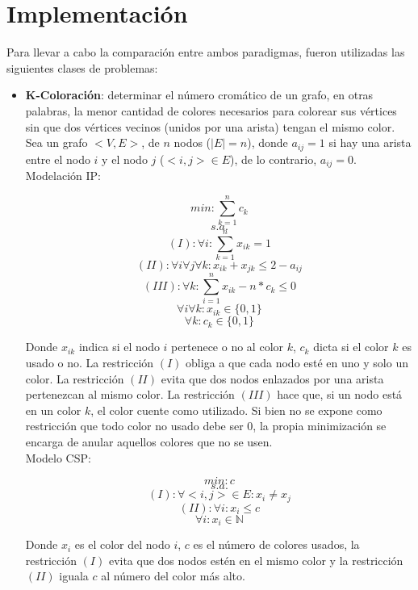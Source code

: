 \documentclass[12pt]{report}
\begin{document}
\chapter{Implementación}

Para llevar a cabo la comparación entre ambos paradigmas, fueron utilizadas las siguientes clases de problemas:
\begin{itemize}
\item \textbf{K-Coloración}: determinar el número cromático de un grafo, en otras palabras, la menor cantidad de colores necesarios para colorear sus vértices sin que dos vértices vecinos (unidos por una arista) tengan el mismo color.\\

Sea un grafo $<V,E>$, de $n$ nodos ($|E|=n$), donde $a_{ij}=1$ si hay una arista entre el nodo $i$ y el nodo $j$ ($<i,j>\in E$), de lo contrario, $a_{ij}=0$.\\

Modelación IP:

$$min: \sum_{k=1}^nc_k$$
$$s.a.$$
$$(I): \forall i: \sum_{k=1}^nx_{ik}=1$$
$$(II): \forall i\forall j \forall k: x_{ik}+x_{jk} \leq 2-a_{ij}$$
$$(III): \forall k: \sum_{i=1}^nx_{ik} -n*c_k\leq 0$$
$$\forall i\forall k: x_{ik}\in\{0,1\}$$
$$\forall k: c_{k}\in\{0,1\}$$

Donde $x_{ik}$ indica si el nodo $i$ pertenece o no al color $k$, $c_k$ dicta si el color $k$ es usado o no. La restricción $(I)$ obliga a que cada nodo esté en uno y solo un color. La restricción $(II)$ evita que dos nodos enlazados por una arista pertenezcan al mismo color. La restricción $(III)$ hace que, si un nodo está en un color $k$, el color cuente como utilizado. Si bien no se expone como restricción que todo color no usado debe ser 0, la propia minimización se encarga de anular aquellos colores que no se usen.\\

Modelo CSP:

$$min: c$$
$$s.a.$$
$$(I):\forall <i,j> \in E: x_i\neq x_j$$
$$(II):\forall i: x_i\leq c$$
$$\forall i: x_i\in \mathbb{N}$$

Donde $x_i$ es el color del nodo $i$, $c$ es el número de colores usados, la restricción $(I)$ evita que dos nodos estén en el mismo color y la restricción $(II)$ iguala $c$ al número del color más alto.



\end{itemize}
\end{document}
